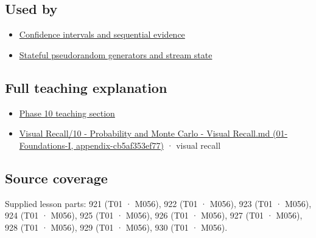 \subsection{Used by}\label{used-by}

\begin{itemize}
\tightlist
\item
  \hyperref[appendix-c83016554b1e]{Confidence intervals and sequential evidence}
\item
  \hyperref[appendix-e0f7c7e08f3a]{Stateful pseudorandom generators and stream state}
\end{itemize}

\subsection{Full teaching explanation}\label{full-teaching-explanation}

\begin{itemize}
\tightlist
\item
  \href{Continuous\%20Notes/Computing\%20Foundations\%20-\%20From\%20Bits\%20to\%20C++\%20and\%20Systems\%20APIs\#4.\%20Discrete\%20and\%20continuous\%20distribution\%20families}{Phase 10 teaching section}
\item
  \href{}{Visual Recall/10 - Probability and Monte Carlo - Visual Recall.md (01-Foundations-I, appendix-cb5af353ef77)} · visual recall
\end{itemize}

\subsection{Source coverage}\label{source-coverage}

Supplied lesson parts: 921 (T01 · M056), 922 (T01 · M056), 923 (T01 · M056), 924 (T01 · M056), 925 (T01 · M056), 926 (T01 · M056), 927 (T01 · M056), 928 (T01 · M056), 929 (T01 · M056), 930 (T01 · M056).
